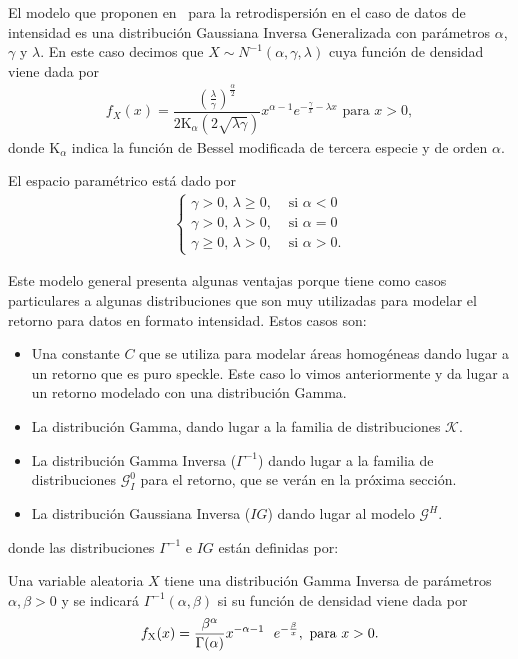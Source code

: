 El modelo que proponen en~\citet{Frery99} para la retrodispersión en el caso de datos de intensidad es una distribución Gaussiana Inversa Generalizada con parámetros $\alpha$, $\gamma$ y $\lambda$. En este caso decimos que  $X\sim N^{-1}(\alpha,\gamma,\lambda)$ cuya función de densidad viene dada por
\begin{align}
f_X(x) = \dfrac{\left(\frac{\lambda}{\gamma}\right)^{\frac{\alpha}{2}}}{2 \text{K}_{\alpha} (2 \sqrt{\lambda \gamma})} x^{\alpha-1} e^{-\frac{\gamma}{x}-\lambda x} \text{ para } x>0,
\label{GIG}
\end{align}
donde $\text{K}_{\alpha}$ indica la función de Bessel modificada de tercera especie y de orden $\alpha$. 

El espacio paramétrico está dado por
\begin{align}
\begin{cases}
\label{EspacioParametros}
	\gamma>0,      \,  \lambda \geq 0,  & \text{ si } \alpha < 0\\
	\gamma>0,      \,  \lambda >0,      & \text{ si } \alpha=0\\
	\gamma \geq 0, \,  \lambda >0,      & \text{ si } \alpha>0.
\end{cases}
\end{align}

Este modelo general presenta algunas ventajas porque tiene como casos particulares a algunas distribuciones que son muy utilizadas para modelar el retorno para datos en formato intensidad. Estos casos son:

\begin{itemize}
	\item Una constante $C$ que se utiliza para modelar áreas homogéneas dando lugar a un retorno que es puro speckle. Este caso lo vimos anteriormente y da lugar a un retorno modelado con una distribución Gamma.
	\item La distribución Gamma, dando lugar a la familia de distribuciones $\mathcal{K}$. 
	\item La distribución Gamma Inversa ($\Gamma^{-1}$) dando lugar a la familia de distribuciones $\mathcal{G}_I^0$ para el retorno, que se verán en la próxima sección.
	\item La distribución Gaussiana Inversa ($IG$) dando lugar al modelo $\mathcal{G}^H$.
\end{itemize}

donde las distribuciones $\Gamma^{-1}$ e  $IG$ están definidas por:

\begin{definition}
	\label{InversaGamma}
	Una variable aleatoria $X$ tiene una distribución Gamma Inversa  de parámetros $\alpha, \beta >0$  y se indicará $\Gamma^{-1}(\alpha,\beta)$ si su función de densidad viene dada por
	\begin{align}
	f_{\text X}(x)=\dfrac{\beta^{\alpha}}{\Gamma(\alpha)} x^{-\alpha-1} \ \ e^{- \frac{\beta}{x}}, \text{ para } x>0.
	\end{align}
\end{definition}

